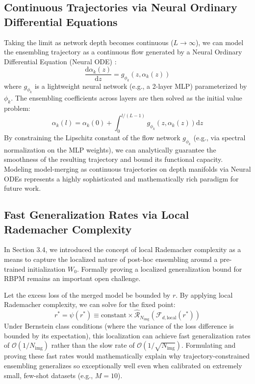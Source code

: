 \subsection{Continuous Trajectories via Neural Ordinary Differential Equations}
Taking the limit as network depth becomes continuous ($L \to \infty$), we can model the ensembling trajectory as a continuous flow generated by a Neural Ordinary Differential Equation (Neural ODE) \cite{chen2018neuralode}:
\begin{equation}
\frac{\text{d}\alpha_k(z)}{\text{d}z} = g_{\phi_k}\left(z, \alpha_k(z)\right)
\end{equation}
where $g_{\phi_k}$ is a lightweight neural network (e.g., a 2-layer MLP) parameterized by $\phi_k$. The ensembling coefficients across layers are then solved as the initial value problem:
\begin{equation}
\alpha_k(l) = \alpha_k(0) + \int_{0}^{l/(L-1)} g_{\phi_k}\left(z, \alpha_k(z)\right) \text{d}z
\end{equation}
By constraining the Lipschitz constant of the flow network $g_{\phi_k}$ (e.g., via spectral normalization on the MLP weights), we can analytically guarantee the smoothness of the resulting trajectory and bound its functional capacity. Modeling model-merging as continuous trajectories on depth manifolds via Neural ODEs represents a highly sophisticated and mathematically rich paradigm for future work.

\subsection{Fast Generalization Rates via Local Rademacher Complexity}
In Section 3.4, we introduced the concept of local Rademacher complexity as a means to capture the localized nature of post-hoc ensembling around a pre-trained initialization $W_0$. Formally proving a localized generalization bound for RBPM remains an important open challenge.

Let the excess loss of the merged model be bounded by $r$. By applying local Rademacher complexity, we can solve for the fixed point:
\begin{equation}
r^* = \psi\left(r^*\right) \equiv \text{constant} \times \widehat{\mathcal{R}}_{N_{\text{img}}}\left(\mathcal{F}_{d, \text{local}}(r^*)\right)
\end{equation}
Under Bernstein class conditions (where the variance of the loss difference is bounded by its expectation), this localization can achieve fast generalization rates of $\mathcal{O}(1/N_{\text{img}})$ rather than the slow rate of $\mathcal{O}(1/\sqrt{N_{\text{img}}})$. Formulating and proving these fast rates would mathematically explain why trajectory-constrained ensembling generalizes so exceptionally well even when calibrated on extremely small, few-shot datasets (e.g., $M = 10$).

